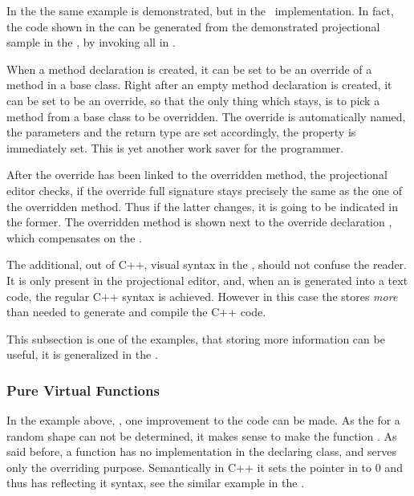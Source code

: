 
In the  the same example is demonstrated, but in the \pcpp\ implementation.
In fact, the code shown in the  can be generated 
from the demonstrated projectional sample in the , by invoking all  in \jbmps.

When a method declaration is created, it can be set to be an override of a method in a base class.
Right after an empty method declaration is created, it can be set to be an override, so that the only
thing which stays, is to pick a method from a base class to be overridden. The override is automatically
named, the parameters and the return type are set accordingly, the  property is immediately
set. This is yet another work saver for the programmer.

After the override has been linked to the overridden method, the projectional editor checks, if 
the override full signature stays precisely the same as the one of the overridden method. Thus if the 
latter changes, it is going to be indicated in the former.
The overridden method is shown next to the override declaration , which 
compensates on the .


The additional, out of C++, visual syntax in the \pcpp, should not confuse the reader. It is only 
present in the projectional editor, and, when an  is generated into a text code, the regular
C++ syntax is achieved. However in this case the  stores \emph{more} than needed to 
generate and compile the C++ code. 

This subsection is one of the examples, that storing more information can be useful,
it is generalized in the .


\subsubsection{Pure Virtual Functions}
\label{purevirtualfuncs}

In the example above, , one improvement to the code can be made. As the  for a random shape can not 
be determined, it makes sense to make the  function . As said before, a  
function has no implementation in the declaring class, and serves only the overriding purpose. Semantically in C++ it sets the 
pointer in  to 0 and thus has reflecting it syntax, see the similar example in the .

